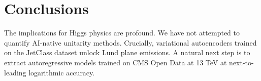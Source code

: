 \section{Conclusions}\label{sec:conclusions}

The implications for Higgs physics are profound. We have not attempted
to quantify AI-native unitarity methods. Crucially, variational
autoencoders trained on the JetClass dataset unlock Lund plane
emissions. A natural next step is to extract autoregressive models
trained on CMS Open Data at 13 TeV at next-to-leading logarithmic
accuracy.

